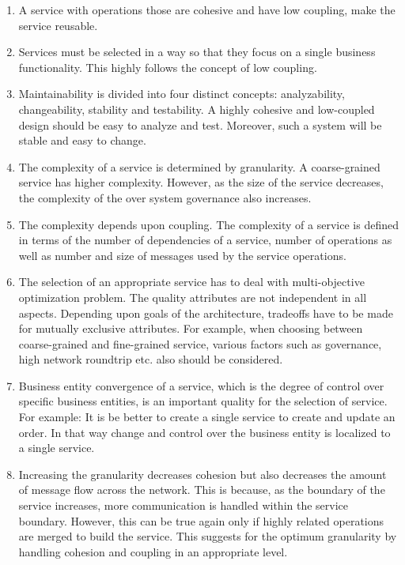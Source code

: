 {{{{{{{{{\begin{enumerate}
\item A service with operations those are cohesive and have low coupling, make the service reusable. \cite{Washizakia:2003aa}\cite{Feuerlicht:2007aa}\cite{Ma:2009aa}

\item Services must be selected in a way so that they focus on a single business functionality. This highly follows the concept of low coupling. \cite{Perepletchikov:2007aa}\cite{Sindhgatta:2015aa}

\item Maintainability is divided into four distinct concepts:  analyzability, changeability, stability and testability.\cite{np:2001aa} A highly cohesive and low-coupled design should be easy to analyze and test. Moreover,  such a system will be stable and easy to change.\cite{Perepletchikov:2007aa}


\item The complexity of a service is determined by granularity. A coarse-grained service has higher complexity. However, as the size of the service decreases, the complexity of the over system governance also increases.
\cite{Saad-Alahmari:2011aa}

\item The complexity depends upon coupling. The complexity of a service is defined in terms of the number of dependencies of a service, number of operations as well as number and size of messages used by the service operations.\cite{Saad-Alahmari:2011aa}\cite{Sindhgatta:2015aa}\cite{Lee:2001aa}

\item The selection of an appropriate service has to deal with multi-objective optimization problem.  The quality attributes are not independent in all aspects. Depending upon goals of the architecture, tradeoffs have to be made for mutually exclusive attributes. For example, when choosing between coarse-grained and fine-grained service, various factors such as governance, high network roundtrip etc. also should be considered. 
\cite{Jamshidi:2008aa}

\item Business entity convergence of a service, which is the degree of control over specific business entities, is an important quality for the selection of service. For example: It is be better to create a single service to create and update an order. In that way change and control over the business entity is localized to a single service.\cite{Ma:2009aa}

\item Increasing the granularity decreases cohesion but also decreases the amount of message flow across the network. This is because, as the boundary of the service increases, more communication is handled within the service boundary. However, this can be true again only if highly related operations are merged to build the service. This suggests for the optimum granularity by handling cohesion and coupling in an appropriate level.\cite{Ma:2009aa}\cite{Bianco:2007aa}


\end{enumerate}}}}}}}}}}
